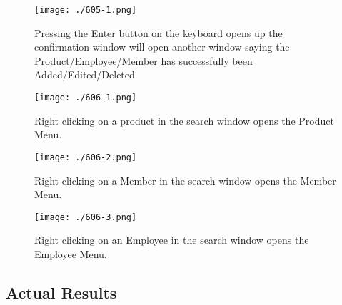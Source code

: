\begin{figure}[H]
    \texttt{[image: ./605-1.png]}
    \caption{Pressing the Enter button on the keyboard opens up the confirmation window will open another window saying the Product/Employee/Member has successfully been Added/Edited/Deleted} \label{fig:605-1}
\end{figure}

\begin{figure}[H]
    \texttt{[image: ./606-1.png]}
    \caption{Right clicking on a product in the search window opens the Product Menu.} \label{fig:606-1}
\end{figure}

\begin{figure}[H]
    \texttt{[image: ./606-2.png]}
    \caption{Right clicking on a Member in the search window opens the Member Menu.} \label{fig:606-2}
\end{figure}

\begin{figure}[H]
    \texttt{[image: ./606-3.png]}
    \caption{Right clicking on an Employee in the search window opens the Employee Menu.} \label{fig:606-3}
\end{figure}



\pagebreak

\subsection{Actual Results}

